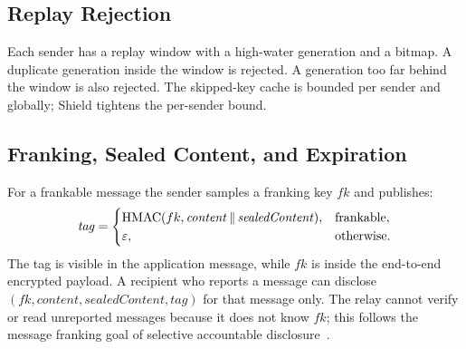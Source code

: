 \documentclass[preprint,12pt]{elsarticle}
\theoremstyle{definition}
\newcommand{\tech}[1]{\textnormal{#1}}
\newcommand{\Shield}{\tech{Shield}}
\newcommand{\HMAC}{\tech{HMAC}}
\newcommand{\concat}{\,\|\,}
\begin{document}
\subsection{Replay Rejection}

Each sender has a replay window with a high-water generation and a bitmap.
A duplicate generation inside the window is rejected. A generation too far
behind the window is also rejected. The skipped-key cache is bounded per
sender and globally; \Shield{} tightens the per-sender bound.

\subsection{Franking, Sealed Content, and Expiration}

For a frankable message the sender samples a franking key $fk$ and publishes:
\begin{equation}
  \mathit{tag} =
  \begin{cases}
    \HMAC(fk,\mathit{content}\concat\mathit{sealedContent}), & \text{frankable},\\
    \varepsilon, & \text{otherwise}.
  \end{cases}
  \label{eq:franking}
\end{equation}
The tag is visible in the application message, while $fk$ is inside the
end-to-end encrypted payload. A recipient who reports a message can disclose
$(fk,\mathit{content},\mathit{sealedContent},\mathit{tag})$ for that message
only. The relay cannot verify or read unreported messages because it does not
know $fk$; this follows the message franking goal of selective accountable
disclosure~\cite{franking}.
\end{document}
